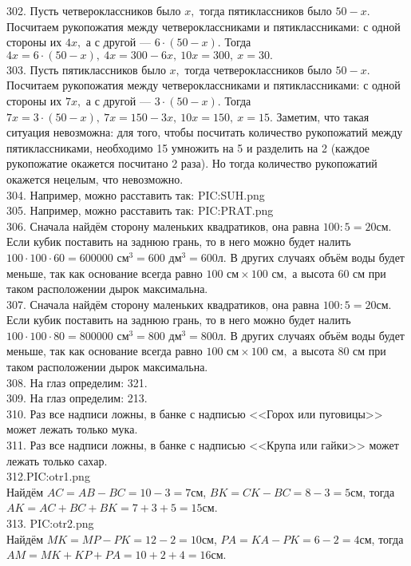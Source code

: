 302. Пусть четвероклассников было $x,$ тогда пятиклассников было  $50-x.$ Посчитаем рукопожатия между четвероклассниками и пятиклассниками: с одной стороны их $4x,$ а с другой --- $6\cdot(50-x).$ Тогда $4x=6\cdot(50-x),\
4x=300-6x,\ 10x=300,\ x=30.$\\
303. Пусть пятиклассников было $x,$ тогда четвероклассников было  $50-x.$ Посчитаем рукопожатия между четвероклассниками и пятиклассниками: с одной стороны их $7x,$ а с другой --- $3\cdot(50-x).$ Тогда $7x=3\cdot(50-x),\
7x=150-3x,\ 10x=150,\ x=15.$ Заметим, что такая ситуация невозможна: для того, чтобы посчитать количество рукопожатий между пятиклассниками, необходимо 15 умножить на 5 и разделить на 2 (каждое рукопожатие окажется посчитано 2 раза). Но тогда количество рукопожатий окажется нецелым, что невозможно.\\
304. Например, можно расставить так:
{{PIC:SUH.png}}\\
305. Например, можно расставить так:
{{PIC:PRAT.png}}\\
306. Сначала найдём сторону маленьких квадратиков, она равна $100:5=20$см. Если кубик поставить на заднюю грань, то в него можно будет налить $100\cdot100\cdot60=600000\text{ см}^3=600\text{ дм}^3=600$л. В других случаях объём воды будет меньше, так как основание всегда равно $100\text{ см}\times100\text{ см},$ а высота 60 см при таком расположении дырок максимальна.\\
307. Сначала найдём сторону маленьких квадратиков, она равна $100:5=20$см. Если кубик поставить на заднюю грань, то в него можно будет налить $100\cdot100\cdot80=800000\text{ см}^3=800\text{ дм}^3=800$л. В других случаях объём воды будет меньше, так как основание всегда равно $100\text{ см}\times100\text{ см},$ а высота 80 см при таком расположении дырок максимальна.\\
308. На глаз определим: 321.\\
309. На глаз определим: 213.\\
310. Раз все надписи ложны, в банке с надписью <<Горох или пуговицы>> может лежать только мука.\\
311. Раз все надписи ложны, в банке с надписью <<Крупа или гайки>> может лежать только сахар.\\
312.{{PIC:otr1.png}}\\
Найдём $AC=AB-BC=10-3=7$см, $BK=CK-BC=8-3=5$см, тогда $AK=AC+BC+BK=7+3+5=15$см.\\
313. {{PIC:otr2.png}}\\
Найдём $MK=MP-PK=12-2=10$см, $PA=KA-PK=6-2=4$см, тогда $AM=MK+KP+PA=10+2+4=16$см.\\
